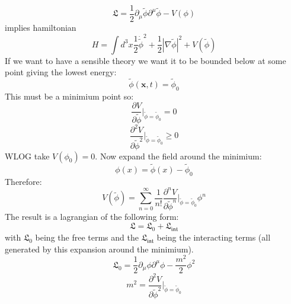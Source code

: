 \documentclass[12pt, a4paper, twoside, titlepage]{article}
\begin{document}
 $$
 \mathfrak{L} = \frac{1}{2} \partial_{\mu} \tilde \phi \partial^{\mu} \tilde \phi - V(\phi)
 $$
 implies hamiltonian
 $$
 H = \int d^3 x\frac{1}{2} \dot{ \tilde \phi}^2 + \frac{1}{2} |\nabla \tilde \phi|^2 + V (\tilde \phi)
 $$
 If we want to have a sensible theory we want it to be bounded below at some point giving the lowest energy:
 $$
 \tilde \phi(\bm x, t) = \tilde \phi_0
 $$
This must be a minimium point so:
\begin{equation}
        \frac{\partial V}{\partial \tilde \phi}|_{\tilde \phi = \tilde \phi_0} = 0
\end{equation}
\begin{equation}
\frac{\partial^2 V}{\partial \tilde \phi^2}|_{\tilde \phi = \tilde \phi_0} \geq 0
\end{equation}
WLOG take $V(\phi_0) = 0$. Now expand the field around the minimium:
$$
\phi(x) = \tilde \phi(x) - \tilde \phi_0
$$
Therefore:
$$
V(\tilde \phi) = \sum_{n=0}^{\infty} \frac{1}{n!} \frac{\partial^n V}{\partial \tilde \phi^n}|_{\tilde \phi = \tilde \phi_0} \phi^n
$$
The result is a lagrangian of the following form:
$$
\mathfrak{L} = \mathfrak{L}_0 + \mathfrak{L_{int}}
$$
with $\mathfrak{L}_0$ being the free terms and the $\mathfrak{L_{int}}$ being the interacting terms (all generated by this expansion around the minimium).
$$
\mathfrak{L}_0 = \frac{1}{2} \partial_{\mu} \phi \partial^{\mu} \phi - \frac{m^2}{2} \phi^2
$$
$$
m^2 = \frac{\partial^2 V}{\partial \tilde \phi^2}|_{\tilde \phi = \tilde \phi_0} 
$$
\end{document}
